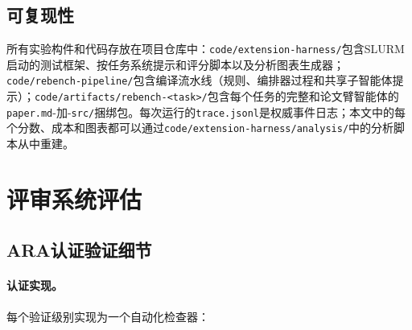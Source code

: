 \subsection{可复现性}
\label{sec-extension-repro}

所有实验构件和代码存放在项目仓库中：\texttt{code/extension-harness/}包含SLURM启动的测试框架、按任务系统提示和评分脚本以及分析图表生成器；\texttt{code/rebench-pipeline/}包含\ara{}编译流水线（规则、编排器过程和共享子智能体提示）；\texttt{code/artifacts/rebench-<task>/}包含每个任务的完整\ara{}和论文臂智能体的\texttt{paper.md}-加-\texttt{src/}捆绑包。每次运行的\texttt{trace.jsonl}是权威事件日志；本文中的每个分数、成本和图表都可以通过\texttt{code/extension-harness/analysis/}中的分析脚本从中重建。


\section{评审系统评估}
\label{sec-review-system}

\subsection{ARA认证验证细节}
\label{sec-seal-details}

\paragraph{认证实现。}
每个验证级别实现为一个自动化检查器：

